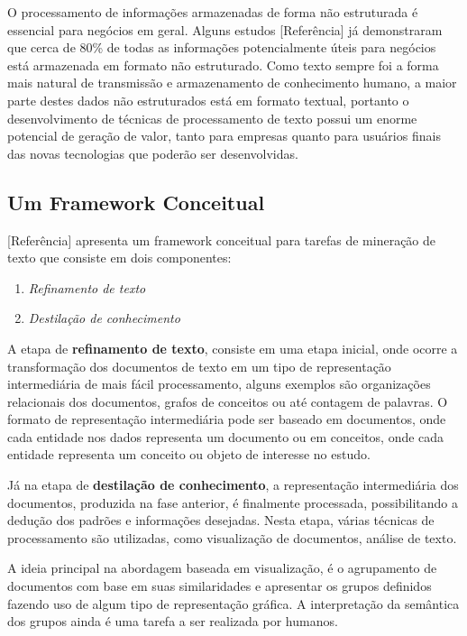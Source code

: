 \quad O processamento de informações armazenadas de forma não estruturada é
essencial para negócios em geral. Alguns estudos [Referência] já demonstraram que
cerca de 80\% de todas as informações potencialmente úteis para negócios está
armazenada em formato não estruturado. Como texto sempre foi a forma mais natural
de transmissão e armazenamento de conhecimento humano, a maior parte destes dados
não estruturados está em formato textual, portanto o desenvolvimento de técnicas
de processamento de texto possui um enorme potencial de geração de valor, tanto
para empresas quanto para usuários finais das novas tecnologias que poderão ser
desenvolvidas.

\subsection{Um Framework Conceitual}

[Referência] apresenta um framework conceitual para tarefas de mineração de texto
que consiste em dois componentes:
\begin{enumerate}
    \item \emph{Refinamento de texto}
    \item \emph{Destilação de conhecimento}
\end{enumerate}

\quad A etapa de \textbf{refinamento de texto}, consiste em uma etapa inicial, onde ocorre a
transformação dos documentos de texto em um tipo de representação intermediária de
mais fácil processamento, alguns exemplos são organizações relacionais dos
documentos, grafos de conceitos ou até contagem de palavras. O formato de
representação intermediária pode ser baseado em documentos, onde cada entidade nos
dados representa um documento ou em conceitos, onde cada entidade representa um
conceito ou objeto de interesse no estudo.

\quad Já na etapa de \textbf{destilação de conhecimento}, a representação 
intermediária dos documentos, produzida na fase anterior, é finalmente processada,
possibilitando a dedução dos padrões e informações desejadas. Nesta etapa, várias
técnicas de processamento são utilizadas, como visualização de documentos, análise
de texto.

\quad A ideia principal na abordagem baseada em visualização, é o agrupamento de
documentos com base em suas similaridades e apresentar os grupos definidos fazendo
uso de algum tipo de representação gráfica. A interpretação da semântica dos grupos
ainda é uma tarefa a ser realizada por humanos.

